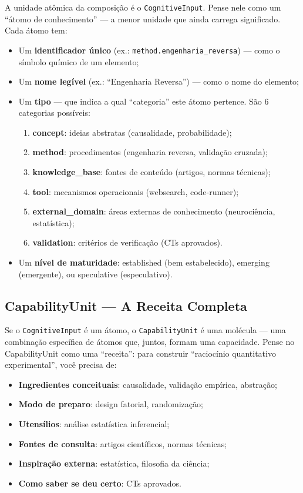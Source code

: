 A unidade atômica da composição é o \texttt{CognitiveInput}. Pense nele como um ``átomo de conhecimento'' — a menor unidade que ainda carrega significado. Cada átomo tem:

\begin{itemize}
    \item Um \textbf{identificador único} (ex.: \texttt{method.engenharia\_reversa}) — como o símbolo químico de um elemento;
    \item Um \textbf{nome legível} (ex.: ``Engenharia Reversa'') — como o nome do elemento;
    \item Um \textbf{tipo} — que indica a qual ``categoria'' este átomo pertence. São 6 categorias possíveis:
    \begin{enumerate}
        \item \textbf{concept}: ideias abstratas (causalidade, probabilidade);
        \item \textbf{method}: procedimentos (engenharia reversa, validação cruzada);
        \item \textbf{knowledge\_base}: fontes de conteúdo (artigos, normas técnicas);
        \item \textbf{tool}: mecanismos operacionais (websearch, code-runner);
        \item \textbf{external\_domain}: áreas externas de conhecimento (neurociência, estatística);
        \item \textbf{validation}: critérios de verificação (CTs aprovados).
    \end{enumerate}
    \item Um \textbf{nível de maturidade}: established (bem estabelecido), emerging (emergente), ou speculative (especulativo).
\end{itemize}

\subsection{CapabilityUnit — A Receita Completa}

Se o \texttt{CognitiveInput} é um átomo, o \texttt{CapabilityUnit} é uma molécula — uma combinação específica de átomos que, juntos, formam uma capacidade. Pense no CapabilityUnit como uma ``receita'': para construir ``raciocínio quantitativo experimental'', você precisa de:

\begin{itemize}
    \item \textbf{Ingredientes conceituais}: causalidade, validação empírica, abstração;
    \item \textbf{Modo de preparo}: design fatorial, randomização;
    \item \textbf{Utensílios}: análise estatística inferencial;
    \item \textbf{Fontes de consulta}: artigos científicos, normas técnicas;
    \item \textbf{Inspiração externa}: estatística, filosofia da ciência;
    \item \textbf{Como saber se deu certo}: CTs aprovados.
\end{itemize}

